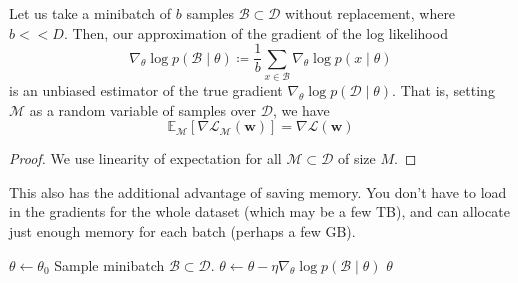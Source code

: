   \begin{theorem}
    Let us take a minibatch of $b$ samples $\mathcal{B} \subset \mathcal{D}$ without replacement, where $b << D$. Then, our approximation of the gradient of the log likelihood
    \begin{equation}
       \nabla_\theta \log{p (\mathcal{B} \mid \theta)} \coloneqq \frac{1}{b} \sum_{x \in \mathcal{B}} \nabla_\theta \log{p(x \mid \theta)}
    \end{equation}
    is an unbiased estimator of the true gradient $\nabla_\theta \log{p(\mathcal{D} \mid \theta)}$. That is, setting $\mathcal{M}$ as a random variable of samples over $\mathcal{D}$, we have 
    \begin{equation}
      \mathbb{E}_{\mathcal{M}} [\nabla \mathcal{L}_{\mathcal{M}} (\mathbf{w})] = \nabla \mathcal{L} (\mathbf{w})
    \end{equation}
  \end{theorem}
  \begin{proof}
    We use linearity of expectation for all $\mathcal{M} \subset \mathcal{D}$ of size $M$. 
  \end{proof} 

  This also has the additional advantage of saving memory. You don't have to load in the gradients for the whole dataset (which may be a few TB), and can allocate just enough memory for each batch (perhaps a few GB). 

  \begin{algo}

    \begin{algorithm}[H]
    \label{alg:stochacistic-gradient-descent}
    \begin{algorithmic}[1]  %
        \State $\theta \gets \theta_0$ 
          \State Sample minibatch $\mathcal{B} \subset \mathcal{D}$. 
          \State $\theta \gets \theta - \eta \nabla_\theta \log p(\mathcal{B} \mid \theta)$ 
        \EndWhile
        \State \Return $\theta$
      \EndProcedure
    \end{algorithmic}
    \end{algorithm} 
  \end{algo} 

